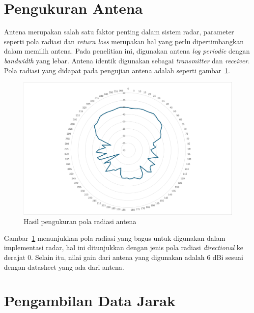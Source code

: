 \section{Pengukuran Antena}
Antena merupakan salah satu faktor penting dalam sistem radar, parameter seperti pola radiasi dan \textit{return loss} merupakan hal yang perlu dipertimbangkan dalam memilih antena. Pada penelitian ini, digunakan antena \textit{log periodic} dengan \textit{bandwidth} yang lebar. Antena identik digunakan sebagai \textit{transmitter} dan \textit{receiver}. Pola radiasi yang didapat pada pengujian antena adalah seperti gambar~\ref{fig:polaRadiasi}.

\begin{figure}
	\centering
	\includegraphics[scale=0.5]{pics/bab4/Ukur Pola Antena 23 Juli/S21A1.png}
	\caption{Hasil pengukuran pola radiasi antena}
	\label{fig:polaRadiasi}
\end{figure}

Gambar~\ref{fig:polaRadiasi} menunjukkan pola radiasi yang bagus untuk digunakan dalam implementasi radar, hal ini ditunjukkan dengan jenis pola radiasi \textit{directional} ke derajat 0. Selain itu, nilai gain dari antena yang digunakan adalah 6 dBi sesuai dengan datasheet yang ada dari antena.

\section{Pengambilan Data Jarak}

